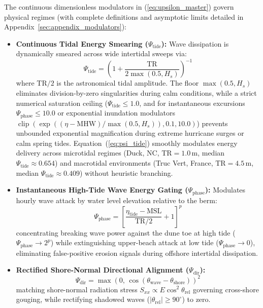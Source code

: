 \documentclass[journal]{IEEEtran}
\begin{document}
The continuous dimensionless modulators in (\ref{eq:upsilon_master}) govern physical regimes (with complete definitions and asymptotic limits detailed in Appendix~\ref{sec:appendix_modulators}):
\begin{itemize}
    \item \textbf{Continuous Tidal Energy Smearing ($\Psi_{\text{tide}}$):} Wave dissipation is dynamically smeared across wide intertidal sweeps via:
    \begin{equation}
    \Psi_{\text{tide}} = \left(1 + \frac{\text{TR}}{2 \max(0.5, H_s)}\right)^{-1}
    \label{eq:psi_tide}
    \end{equation}
    where $\text{TR}/2$ is the astronomical tidal amplitude. The floor $\max(0.5, H_s)$ eliminates division-by-zero singularities during calm conditions, while a strict numerical saturation ceiling ($\Psi_{\text{tide}} \le 1.0$, and for instantaneous excursions $\Psi_{\text{phase}} \le 10.0$ or exponential inundation modulators $\operatorname{clip}(\exp((\eta - \text{MHW})/\max(0.5, H_s)), 0.1, 10.0)$) prevents unbounded exponential magnification during extreme hurricane surges or calm spring tides. Equation~(\ref{eq:psi_tide}) smoothly modulates energy delivery across microtidal regimes (Duck, NC, $\text{TR} = 1.0\,\text{m}$, median $\Psi_{\text{tide}} \approx 0.654$) and macrotidal environments (Truc Vert, France, $\text{TR} = 4.5\,\text{m}$, median $\Psi_{\text{tide}} \approx 0.409$) without heuristic branching.
    \item \textbf{Instantaneous High-Tide Wave Energy Gating ($\Psi_{\text{phase}}$):} Modulates hourly wave attack by water level elevation relative to the berm:
    \begin{equation}
    \Psi_{\text{phase}} = \left[\frac{\eta_{\text{tide}} - \text{MSL}}{\text{TR}/2} + 1\right]^p
    \label{eq:psi_phase}
    \end{equation}
    concentrating breaking wave power against the dune toe at high tide ($\Psi_{\text{phase}} \to 2^p$) while extinguishing upper-beach attack at low tide ($\Psi_{\text{phase}} \to 0$), eliminating false-positive erosion signals during offshore intertidal dissipation.
    \item \textbf{Rectified Shore-Normal Directional Alignment ($\Psi_{\text{dir}}$):}
    \begin{equation}
    \Psi_{\text{dir}} = \max\left(0,\, \cos(\theta_{\text{wave}} - \theta_{\text{shore}})\right)^2
    \label{eq:psi_dir}
    \end{equation}
    matching shore-normal radiation stress $S_{xx} \propto E \cos^2\theta_{\text{rel}}$ governing cross-shore gouging, while rectifying shadowed waves ($|\theta_{\text{rel}}| \ge 90^\circ$) to zero.

\end{itemize}
\end{document}
